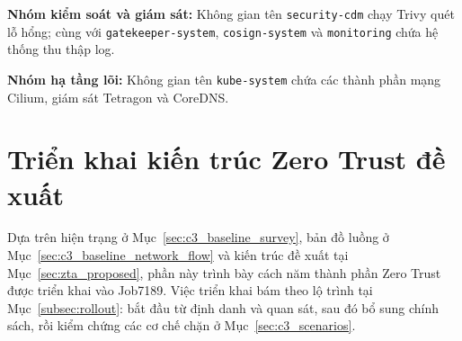 \textbf{Nhóm kiểm soát và giám sát:} Không gian tên \texttt{security-cdm} chạy Trivy quét lỗ hổng; cùng với \texttt{gatekeeper-system}, \texttt{cosign-system} và \texttt{monitoring} chứa hệ thống thu thập log.

\textbf{Nhóm hạ tầng lõi:} Không gian tên \texttt{kube-system} chứa các thành phần mạng Cilium, giám sát Tetragon và CoreDNS.

\section{Triển khai kiến trúc Zero Trust đề xuất}

Dựa trên hiện trạng ở Mục~\ref{sec:c3_baseline_survey}, bản đồ luồng ở Mục~\ref{sec:c3_baseline_network_flow} và kiến trúc đề xuất tại Mục~\ref{sec:zta_proposed}, phần này trình bày cách năm thành phần Zero Trust được triển khai vào Job7189. Việc triển khai bám theo lộ trình tại Mục~\ref{subsec:rollout}: bắt đầu từ định danh và quan sát, sau đó bổ sung chính sách, rồi kiểm chứng các cơ chế chặn ở Mục~\ref{sec:c3_scenarios}.

